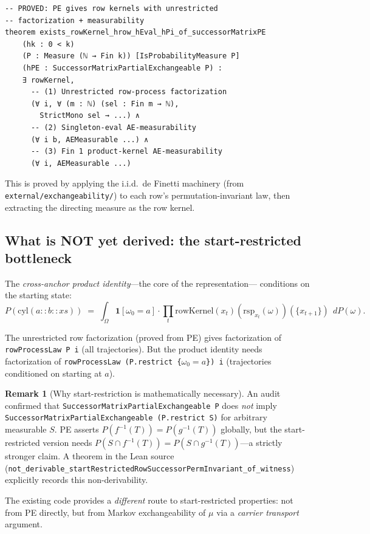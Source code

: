 \documentclass[11pt]{article}
\theoremstyle{definition}
\newtheorem{remark}[theorem]{Remark}
\newcommand{\lean}[1]{\texttt{#1}}
\begin{document}
\begin{lstlisting}
-- PROVED: PE gives row kernels with unrestricted
-- factorization + measurability
theorem exists_rowKernel_hrow_hEval_hPi_of_successorMatrixPE
    (hk : 0 < k)
    (P : Measure (ℕ → Fin k)) [IsProbabilityMeasure P]
    (hPE : SuccessorMatrixPartialExchangeable P) :
    ∃ rowKernel,
      -- (1) Unrestricted row-process factorization
      (∀ i, ∀ (m : ℕ) (sel : Fin m → ℕ),
        StrictMono sel → ...) ∧
      -- (2) Singleton-eval AE-measurability
      (∀ i b, AEMeasurable ...) ∧
      -- (3) Fin 1 product-kernel AE-measurability
      (∀ i, AEMeasurable ...)
\end{lstlisting}

This is proved by applying the i.i.d.\ de Finetti machinery (from
\texttt{external/exchangeability/}) to each row's permutation-invariant
law, then extracting the directing measure as the row kernel.

\subsection{What is NOT yet derived: the start-restricted bottleneck}

The \emph{cross-anchor product identity}---the core of the representation---
conditions on the starting state:
\[
P(\mathrm{cyl}(a :: b :: xs))
\;=\; \int_\Omega
\mathbf{1}[\omega_0 = a] \cdot \prod_t \mathrm{rowKernel}(x_t)(\mathrm{rsp}_{x_t}(\omega))(\{x_{t+1}\})
\;\, dP(\omega).
\]

The unrestricted row factorization (proved from PE) gives factorization
of \lean{rowProcessLaw P i} (all trajectories).  But the product identity
needs factorization of \lean{rowProcessLaw (P.restrict \{$\omega_0 = a$\}) i}
(trajectories conditioned on starting at $a$).

\begin{remark}[Why start-restriction is mathematically necessary]
An audit confirmed that \lean{SuccessorMatrixPartialExchangeable P} does
\emph{not} imply \lean{SuccessorMatrixPartialExchangeable (P.restrict S)}
for arbitrary measurable $S$.  PE asserts
$P(f^{-1}(T)) = P(g^{-1}(T))$ globally, but the start-restricted version
needs $P(S \cap f^{-1}(T)) = P(S \cap g^{-1}(T))$---a strictly stronger
claim.  A theorem in the Lean source (\lean{not\_derivable\-\_startRestricted\-RowSuccessorPermInvariant\_of\_witness})
explicitly records this non-derivability.
\end{remark}

The existing code provides a \emph{different} route to start-restricted
properties: not from PE directly, but from Markov exchangeability of $\mu$
via a \emph{carrier transport} argument.
\end{document}
